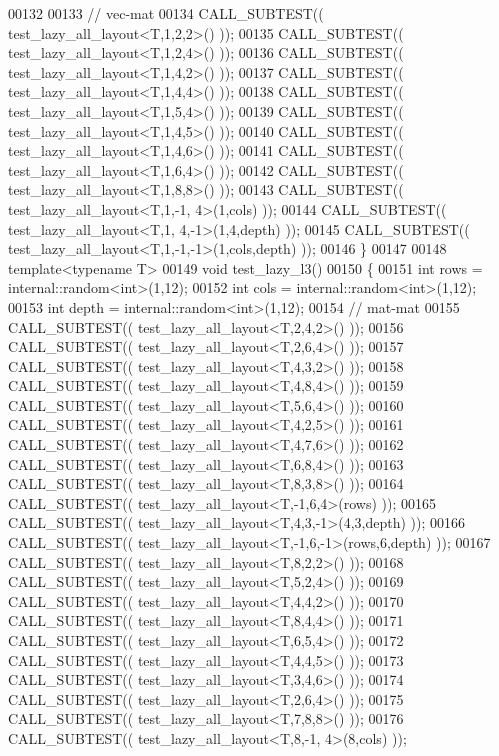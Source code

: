 \begin{DoxyCode}
00132 
00133   \textcolor{comment}{// vec-mat}
00134   CALL\_SUBTEST(( test\_lazy\_all\_layout<T,1,2,2>() ));
00135   CALL\_SUBTEST(( test\_lazy\_all\_layout<T,1,2,4>() ));
00136   CALL\_SUBTEST(( test\_lazy\_all\_layout<T,1,4,2>() ));
00137   CALL\_SUBTEST(( test\_lazy\_all\_layout<T,1,4,4>() ));
00138   CALL\_SUBTEST(( test\_lazy\_all\_layout<T,1,5,4>() ));
00139   CALL\_SUBTEST(( test\_lazy\_all\_layout<T,1,4,5>() ));
00140   CALL\_SUBTEST(( test\_lazy\_all\_layout<T,1,4,6>() ));
00141   CALL\_SUBTEST(( test\_lazy\_all\_layout<T,1,6,4>() ));
00142   CALL\_SUBTEST(( test\_lazy\_all\_layout<T,1,8,8>() ));
00143   CALL\_SUBTEST(( test\_lazy\_all\_layout<T,1,-1, 4>(1,cols) ));
00144   CALL\_SUBTEST(( test\_lazy\_all\_layout<T,1, 4,-1>(1,4,depth) ));
00145   CALL\_SUBTEST(( test\_lazy\_all\_layout<T,1,-1,-1>(1,cols,depth) ));
00146 \}
00147 
00148 \textcolor{keyword}{template}<\textcolor{keyword}{typename} T>
00149 \textcolor{keywordtype}{void} test\_lazy\_l3()
00150 \{
00151   \textcolor{keywordtype}{int} rows = internal::random<int>(1,12);
00152   \textcolor{keywordtype}{int} cols = internal::random<int>(1,12);
00153   \textcolor{keywordtype}{int} depth = internal::random<int>(1,12);
00154   \textcolor{comment}{// mat-mat}
00155   CALL\_SUBTEST(( test\_lazy\_all\_layout<T,2,4,2>() ));
00156   CALL\_SUBTEST(( test\_lazy\_all\_layout<T,2,6,4>() ));
00157   CALL\_SUBTEST(( test\_lazy\_all\_layout<T,4,3,2>() ));
00158   CALL\_SUBTEST(( test\_lazy\_all\_layout<T,4,8,4>() ));
00159   CALL\_SUBTEST(( test\_lazy\_all\_layout<T,5,6,4>() ));
00160   CALL\_SUBTEST(( test\_lazy\_all\_layout<T,4,2,5>() ));
00161   CALL\_SUBTEST(( test\_lazy\_all\_layout<T,4,7,6>() ));
00162   CALL\_SUBTEST(( test\_lazy\_all\_layout<T,6,8,4>() ));
00163   CALL\_SUBTEST(( test\_lazy\_all\_layout<T,8,3,8>() ));
00164   CALL\_SUBTEST(( test\_lazy\_all\_layout<T,-1,6,4>(rows) ));
00165   CALL\_SUBTEST(( test\_lazy\_all\_layout<T,4,3,-1>(4,3,depth) ));
00166   CALL\_SUBTEST(( test\_lazy\_all\_layout<T,-1,6,-1>(rows,6,depth) ));
00167   CALL\_SUBTEST(( test\_lazy\_all\_layout<T,8,2,2>() ));
00168   CALL\_SUBTEST(( test\_lazy\_all\_layout<T,5,2,4>() ));
00169   CALL\_SUBTEST(( test\_lazy\_all\_layout<T,4,4,2>() ));
00170   CALL\_SUBTEST(( test\_lazy\_all\_layout<T,8,4,4>() ));
00171   CALL\_SUBTEST(( test\_lazy\_all\_layout<T,6,5,4>() ));
00172   CALL\_SUBTEST(( test\_lazy\_all\_layout<T,4,4,5>() ));
00173   CALL\_SUBTEST(( test\_lazy\_all\_layout<T,3,4,6>() ));
00174   CALL\_SUBTEST(( test\_lazy\_all\_layout<T,2,6,4>() ));
00175   CALL\_SUBTEST(( test\_lazy\_all\_layout<T,7,8,8>() ));
00176   CALL\_SUBTEST(( test\_lazy\_all\_layout<T,8,-1, 4>(8,cols) ));

\end{DoxyCode}
